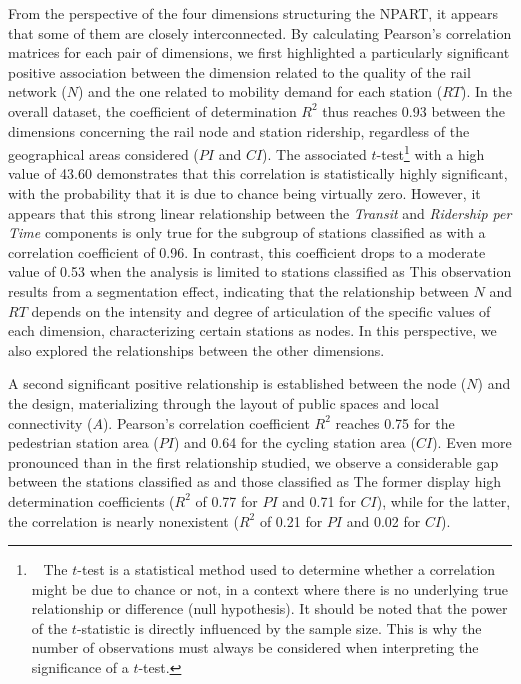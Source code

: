 \begin{refsegment}
From the perspective of the four dimensions structuring the \acrshort{NPART}, it appears that some of them are closely interconnected. By calculating Pearson's correlation matrices for each pair of dimensions, we first highlighted a particularly significant positive association between the dimension related to the quality of the rail network (\(N\)) and the one related to mobility demand for each station (\(RT\)). In the overall dataset, the coefficient of determination \(R^2\) thus reaches 0.93 between the dimensions concerning the rail node and station ridership, regardless of the geographical areas considered (\(PI\) and \(CI\)). The associated \(t\)-test\footnote{~
    The \(t\)-test is a statistical method used to determine whether a correlation might be due to chance or not, in a context where there is no underlying true relationship or difference (null hypothesis). It should be noted that the power of the \(t\)-statistic is directly influenced by the sample size. This is why the number of observations must always be considered when interpreting the significance of a \(t\)-test.
} with a high value of 43.60 demonstrates that this correlation is statistically highly significant, with the probability that it is due to chance being virtually zero. However, it appears that this strong linear relationship between the \textsl{Transit} and \textsl{Ridership per Time} components is only true for the subgroup of stations classified as  with a correlation coefficient of 0.96. In contrast, this coefficient drops to a moderate value of 0.53 when the analysis is limited to stations classified as  This observation results from a segmentation effect, indicating that the relationship between \(N\) and \(RT\) depends on the intensity and degree of articulation of the specific values of each dimension, characterizing certain stations as  nodes. In this perspective, we also explored the relationships between the other dimensions.%

A second significant positive relationship is established between the node (\(N\)) and the design, materializing through the layout of public spaces and local connectivity (\(A\)). Pearson's correlation coefficient \(R^2\) reaches 0.75 for the pedestrian station area (\(PI\)) and 0.64 for the cycling station area (\(CI\)). Even more pronounced than in the first relationship studied, we observe a considerable gap between the stations classified as  and those classified as  The former display high determination coefficients (\(R^2\) of 0.77 for \(PI\) and 0.71 for \(CI\)), while for the latter, the correlation is nearly nonexistent (\(R^2\) of 0.21 for \(PI\) and 0.02 for \(CI\)).%


\end{refsegment}
